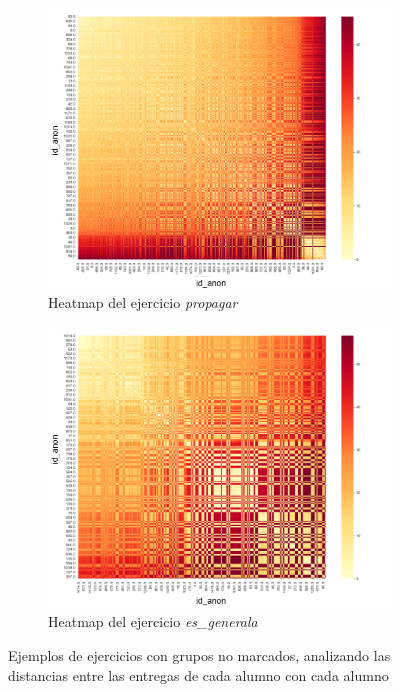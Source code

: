 \documentclass[11pt,a4paper,twoside,openany]{tesis}
\begin{document}
\begin{figure}[H]
    \centering
    \begin{subfigure}{0.45\textwidth}
        \includegraphics[width=\linewidth]{imagenes/heatmap-1-propagar.png}
        \caption{Heatmap del ejercicio \emph{propagar}}
        \label{fig:figura1}
    \end{subfigure}
    \hfill
    \begin{subfigure}{0.45\textwidth}
        \includegraphics[width=\linewidth]{imagenes/heatmap-1-prob generala.png}
        \caption{Heatmap del ejercicio \emph{es\_generala}}
        \label{fig:figura2}
    \end{subfigure}
    \caption{Ejemplos de ejercicios con grupos no marcados, analizando las distancias entre las entregas de cada alumno con cada alumno}
    \label{fig:figuras_juntas}
\end{figure}
\end{document}
